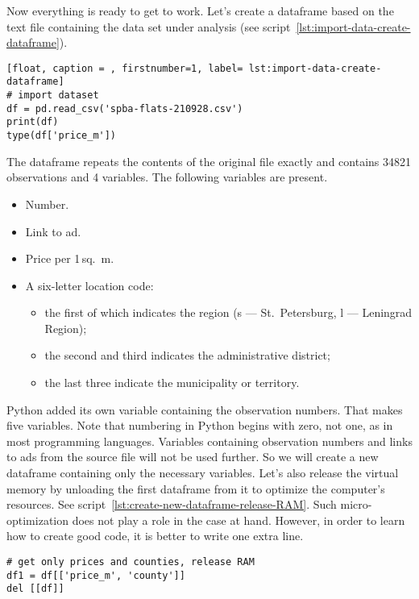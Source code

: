 \documentclass[]{scrreprt}
\begin{document}
Now everything is ready to get to work. Let's create a dataframe based on the text file containing the data set under analysis (see script~\ref{lst:import-data-create-dataframe}).
%
\begin{lstlisting}[float, caption = , firstnumber=1, label= lst:import-data-create-dataframe]
# import dataset
df = pd.read_csv('spba-flats-210928.csv')
print(df)
type(df['price_m'])
\end{lstlisting}
%
The dataframe repeats the contents of the original file exactly and contains 34821 observations and 4 variables. The following variables are present.
\begin{itemize}
	\item Number.
	\item Link to ad.
	\item Price per 1\,sq.~m.
	\item A six-letter location code:
	\begin{itemize}
		\item the first of which indicates the region (s --- St.~Petersburg, l --- Leningrad Region);
		\item the second and third indicates the administrative district;
		\item the last three indicate the municipality or territory.		
	\end{itemize}
\end{itemize}
Python added its own variable containing the observation numbers. That makes five variables. Note that numbering in Python begins with zero, not one, as in most programming languages. Variables containing observation numbers and links to ads from the source file will not be used further. So we will create a new dataframe containing only the necessary variables. Let's also release the virtual memory by unloading the first dataframe from it to optimize the computer's resources. See script~\ref{lst:create-new-dataframe-release-RAM}. Such micro-optimization does not play a role in the case at hand. However, in order to learn how to create good code, it is better to write one extra line.
%
\begin{lstlisting}[float, caption = Creating a dataframe containing only necessary variables and freeing memory from objects not used later, firstnumber=1, label= lst:create-new-dataframe-release-RAM]
# get only prices and counties, release RAM
df1 = df[['price_m', 'county']]
del [[df]]
\end{lstlisting}
%
\end{document}
